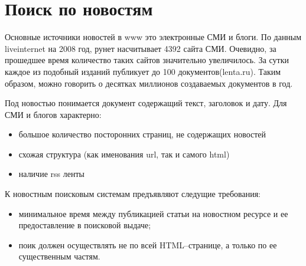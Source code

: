 \section{Поиск по новостям}

Основные источники новостей в www это электронные СМИ и блоги. По данным
liveinternet на 2008 год, рунет насчитывает 4392 сайта СМИ. 
Очевидно, за прошедшее время количество таких сайтов значительно увеличилось. За сутки каждое
из подобный изданий публикует до 100 документов(lenta.ru). Таким образом, 
можно говорить о десятках миллионов создаваемых документов в год.

Под новостью понимается документ содержащий текст, заголовок и дату. Для СМИ и
блогов характерно: \begin{itemize} \item большое количество посторонних страниц,
не содержащих новостей \item схожая структура (как именования url, так и самого
html) \item наличие rss ленты \end{itemize}

К новостным поисковым системам предъявляют следущие требования:
\begin{itemize} 
\item минимальное время между публикацией статьи на новостном ресурсе и ее 
    предоставление в поисковой выдаче;
\item поик должен осуществлять не по всей HTML--странице, а только по ее 
    существенным частям. 
\end{itemize}


